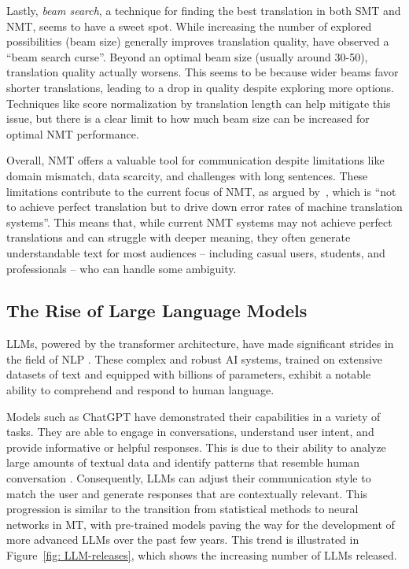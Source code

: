 {{Lastly, \textit{beam search}, a technique for finding the best translation in both SMT and NMT, seems to have a sweet spot. While increasing the number of explored possibilities (beam size) generally improves translation quality, \textcite{koehn-knowles-2017-six} have observed a ``beam search curse''. Beyond an optimal beam size (usually around 30-50), translation quality actually worsens. This seems to be because wider beams favor shorter translations, leading to a drop in quality despite exploring more options. Techniques like score normalization by translation length can help mitigate this issue, but there is a clear limit to how much beam size can be increased for optimal NMT performance.

Overall, NMT offers a valuable tool for communication despite limitations like domain mismatch, data scarcity, and challenges with long sentences. These limitations contribute to the current focus of NMT, as argued by~\textcite[19]{koehn2020neural}, which is ``not to achieve perfect translation but to drive down error rates of machine translation systems''. This means that, while current NMT systems may not achieve perfect translations and can struggle with deeper meaning, they often generate understandable text for most audiences -- including casual users, students, and professionals -- who can handle some ambiguity.


\subsection{The Rise of Large Language Models}

LLMs, powered by the transformer architecture, have made significant strides in the field of NLP \parencite{zhao2023survey}. These complex and robust AI systems, trained on extensive datasets of text and equipped with billions of parameters, exhibit a notable ability to comprehend and respond to human language.

Models such as ChatGPT have demonstrated their capabilities in a variety of tasks. They are able to engage in conversations, understand user intent, and provide informative or helpful responses. This is due to their ability to analyze large amounts of textual data and identify patterns that resemble human conversation \parencite{yuhan-etal-2023-unleashing}. Consequently, LLMs can adjust their communication style to match the user and generate responses that are contextually relevant. This progression is similar to the transition from statistical methods to neural networks in MT, with pre-trained models paving the way for the development of more advanced LLMs over the past few years. This trend is illustrated in Figure~\ref{fig: LLM-releases}, which shows the increasing number of LLMs released.

}}
